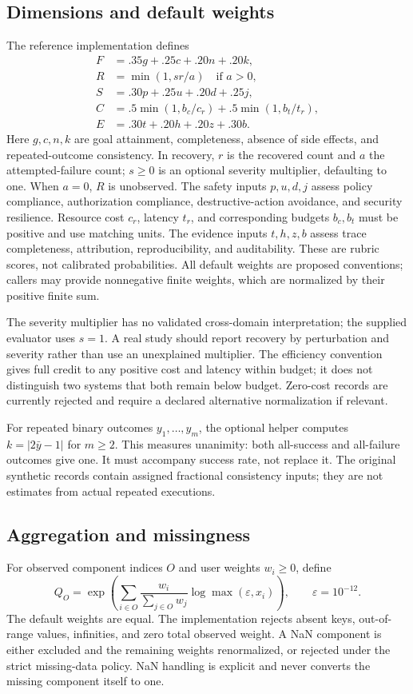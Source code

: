 \documentclass[11pt]{article}
\begin{document}
\subsection{Dimensions and default weights}
The reference implementation defines
\begin{align}
F &= .35g+.25c+.20n+.20k,\\
R &= \min(1,sr/a)\quad\text{if }a>0,\\
S &= .30p+.25u+.20d+.25j,\\
C &= .5\min(1,b_c/c_r)+.5\min(1,b_t/t_r),\\
E &= .30t+.20h+.20z+.30b.
\end{align}
Here $g,c,n,k$ are goal attainment, completeness, absence of side effects, and repeated-outcome consistency. In recovery, $r$ is the recovered count and $a$ the attempted-failure count; $s\geq0$ is an optional severity multiplier, defaulting to one. When $a=0$, $R$ is unobserved. The safety inputs $p,u,d,j$ assess policy compliance, authorization compliance, destructive-action avoidance, and security resilience. Resource cost $c_r$, latency $t_r$, and corresponding budgets $b_c,b_t$ must be positive and use matching units. The evidence inputs $t,h,z,b$ assess trace completeness, attribution, reproducibility, and auditability. These are rubric scores, not calibrated probabilities. All default weights are proposed conventions; callers may provide nonnegative finite weights, which are normalized by their positive finite sum.

The severity multiplier has no validated cross-domain interpretation; the supplied evaluator uses $s=1$. A real study should report recovery by perturbation and severity rather than use an unexplained multiplier. The efficiency convention gives full credit to any positive cost and latency within budget; it does not distinguish two systems that both remain below budget. Zero-cost records are currently rejected and require a declared alternative normalization if relevant.

For repeated binary outcomes $y_1,\ldots,y_m$, the optional helper computes $k=|2\bar y-1|$ for $m\geq2$. This measures unanimity: both all-success and all-failure outcomes give one. It must accompany success rate, not replace it. The original synthetic records contain assigned fractional consistency inputs; they are not estimates from actual repeated executions.

\subsection{Aggregation and missingness}
For observed component indices $O$ and user weights $w_i\geq0$, define
\begin{equation}\label{eq:aggregate}
Q_O=\exp\left(\sum_{i\in O}\frac{w_i}{\sum_{j\in O}w_j}
\log\max(\varepsilon,x_i)\right),\qquad \varepsilon=10^{-12}.
\end{equation}
The default weights are equal. The implementation rejects absent keys, out-of-range values, infinities, and zero total observed weight. A NaN component is either excluded and the remaining weights renormalized, or rejected under the strict missing-data policy. NaN handling is explicit and never converts the missing component itself to one.
\end{document}
